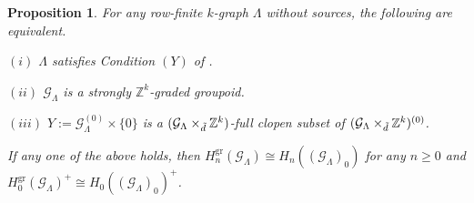 \documentclass[12pt]{amsart}
\newtheorem{prop}[thm]{Proposition}
\theoremstyle{definition}
\theoremstyle{remark}
\newcommand{\gr}{\operatorname{gr}}
\begin{document}
\begin{prop}\label{pro connecting graded homology to non-graded one}
For any row-finite $k$-graph $\Lambda$ without sources, the following are equivalent.

$(i)$ $\Lambda$ satisfies Condition $(Y)$ of \cite[Definition 4.10]{CHR}.

$(ii)$ $\mathcal{G}_\Lambda$ is a strongly $\mathbb{Z}^k$-graded groupoid.

$(iii)$ $Y:=\mathcal{G}_\Lambda^{(0)}\times \{0\}$ is a $(\mathcal{G}_\Lambda\times_{\Tilde{d}} \mathbb{Z}^k)$-full clopen subset of $(\mathcal{G}_\Lambda\times_{\Tilde{d}} \mathbb{Z}^k)^{(0)}$.

If any one of the above holds, then $H_n^{\gr}(\mathcal{G}_\Lambda)\cong H_n((\mathcal{G}_\Lambda)_0)$ for any $n\ge 0$ and $H_0^{\gr}(\mathcal{G}_\Lambda)^+\cong H_0((\mathcal{G}_\Lambda)_0)^+$.  
\end{prop}
\end{document}
